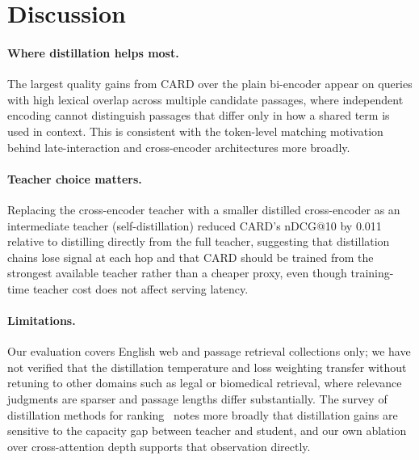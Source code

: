 \section{Discussion}
\label{sec:discussion}

\paragraph{Where distillation helps most.} The largest quality gains from
CARD over the plain bi-encoder appear on queries with high lexical overlap
across multiple candidate passages, where independent encoding cannot
distinguish passages that differ only in how a shared term is used in
context. This is consistent with the token-level matching motivation behind
late-interaction and cross-encoder architectures more broadly.

\paragraph{Teacher choice matters.} Replacing the cross-encoder teacher with
a smaller distilled cross-encoder as an intermediate teacher
(self-distillation) reduced CARD's nDCG@10 by 0.011 relative to distilling
directly from the full teacher, suggesting that distillation chains lose
signal at each hop and that CARD should be trained from the strongest
available teacher rather than a cheaper proxy, even though training-time
teacher cost does not affect serving latency.

\paragraph{Limitations.} Our evaluation covers English web and passage
retrieval collections only; we have not verified that the distillation
temperature and loss weighting transfer without retuning to other domains
such as legal or biomedical retrieval, where relevance judgments are sparser
and passage lengths differ substantially. The survey of distillation methods
for ranking~\cite{fakhoury2022survey} notes more broadly that distillation
gains are sensitive to the capacity gap between teacher and student, and our
own ablation over cross-attention depth supports that observation directly.
